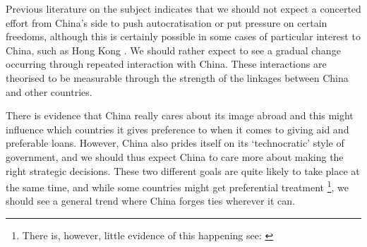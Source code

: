 Previous literature on the subject indicates that we should not expect a concerted effort from China's side to push autocratisation or put pressure on certain freedoms, although this is certainly possible in some cases of particular interest to China, such as Hong Kong \citep{chen_democracy_2015}. We should rather expect to see a gradual change occurring through repeated interaction with China. These interactions are theorised to be measurable through the strength of the linkages between China and other countries.

There is evidence that China really cares about its image abroad and this might influence which countries it gives preference to when it comes to giving aid and preferable loans. However, China also prides itself on its `technocratic' style of government, and we should thus expect China to care more about making the right strategic decisions. These two different goals are quite likely to take place at the same time, and while some countries might get preferential treatment \footnote{There is, however, little evidence of this happening see: \citet{brand_authoritarian_2015}}, we should see a general trend where China forges ties wherever it can.

